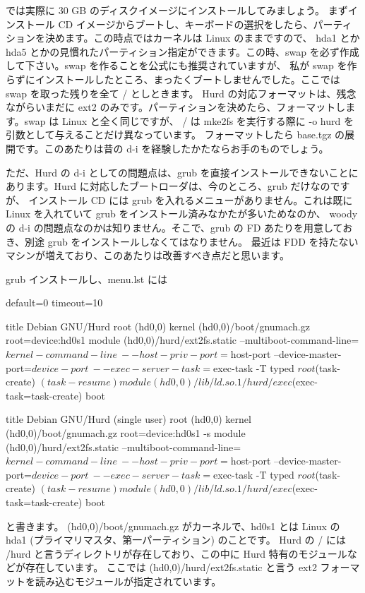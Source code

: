 \documentclass[mingoth,a4paper]{jsarticle}
\begin{document}
では実際に 30 GB のディスクイメージにインストールしてみましょう。
まずインストール CD イメージからブートし、キーボードの選択をしたら、パーティションを決めます。この時点ではカーネルは Linux のままですので、
hda1 とか hda5 とかの見慣れたパーティション指定ができます。この時、swap を必ず作成して下さい。swap を作ることを公式にも推奨されていますが、
私が swap を作らずにインストールしたところ、まったくブートしませんでした。ここでは swap を取った残りを全て / としときます。
Hurd の対応フォーマットは、残念ながらいまだに ext2 のみです。パーティションを決めたら、フォーマットします。swap は Linux と全く同じですが、
/ は mke2fs を実行する際に -o hurd を引数として与えることだけ異なっています。
フォーマットしたら base.tgz の展開です。このあたりは昔の d-i を経験したかたならお手のものでしょう。

ただ、Hurd の d-i としての問題点は、grub を直接インストールできないことにあります。Hurd に対応したブートローダは、今のところ、grub だけなのですが、
インストール CD には grub を入れるメニューがありません。これは既に Linux を入れていて grub をインストール済みなかたが多いためなのか、
woody の d-i の問題点なのかは知りません。そこで、grub の FD あたりを用意しておき、別途 grub をインストールしなくてはなりません。
最近は FDD を持たないマシンが増えており、このあたりは改善すべき点だと思います。

grub インストールし、menu.lst には
\begin{commandline}
default=0
timeout=10

title  Debian GNU/Hurd
root (hd0,0)
kernel (hd0,0)/boot/gnumach.gz root=device:hd0s1
module (hd0,0)/hurd/ext2fs.static --multiboot-command-line=${kernel-command-line} \
--host-priv-port=${host-port} --device-master-port=${device-port} \
--exec-server-task=${exec-task} -T typed ${root} $(task-create) $(task-resume)
module (hd0,0)/lib/ld.so.1 /hurd/exec $(exec-task=task-create)
boot

title  Debian GNU/Hurd (single user)
root (hd0,0)
kernel (hd0,0)/boot/gnumach.gz root=device:hd0s1 -s
module (hd0,0)/hurd/ext2fs.static --multiboot-command-line=${kernel-command-line} \
--host-priv-port=${host-port} --device-master-port=${device-port} \
--exec-server-task=${exec-task} -T typed ${root} $(task-create) $(task-resume)
module (hd0,0)/lib/ld.so.1 /hurd/exec $(exec-task=task-create)
boot
\end{commandline}
と書きます。 (hd0,0)/boot/gnumach.gz がカーネルで、hd0s1 とは Linux の hda1 (プライマリマスタ、第一パーティション) のことです。
Hurd の / には /hurd と言うディレクトリが存在しており、この中に Hurd 特有のモジュールなどが存在しています。
ここでは (hd0,0)/hurd/ext2fs.static と言う ext2 フォーマットを読み込むモジュールが指定されています。
\end{document}
